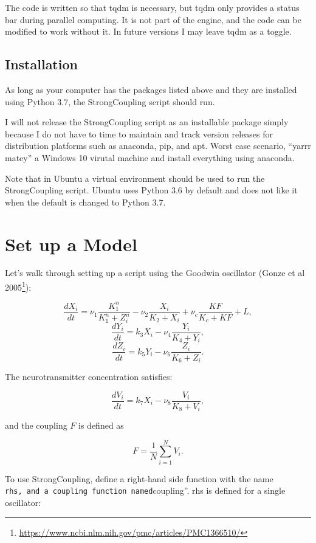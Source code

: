 \documentclass[
  english,
  a4paper,
  oneside]{article}
\DeclareRobustCommand{\href}[2]{#2\footnote{\url{#1}}}
\begin{document}
The code is written so that tqdm is necessary, but tqdm only provides a
status bar during parallel computing. It is not part of the engine, and
the code can be modified to work without it. In future versions I may
leave tqdm as a toggle.

\hypertarget{installation}{%
\subsection{Installation}\label{installation}}

As long as your computer has the packages listed above and they are
installed using Python 3.7, the StrongCoupling script should run.

I will not release the StrongCoupling script as an installable package
simply because I do not have to time to maintain and track version
releases for distribution platforms such as anaconda, pip, and apt.
Worst case scenario, ``yarrr matey'' a Windows 10 virutal machine and
install everything using anaconda.

Note that in Ubuntu a virtual environment should be used to run the
StrongCoupling script. Ubuntu uses Python 3.6 by default and does not
like it when the default is changed to Python 3.7.

\hypertarget{set-up-a-model}{%
\section{Set up a Model}\label{set-up-a-model}}

Let's walk through setting up a script using the Goodwin oscillator
(\href{https://www.ncbi.nlm.nih.gov/pmc/articles/PMC1366510/}{Gonze et
al 2005}):

\[\frac{dX_i}{dt} = \nu_1 \frac{K_1^n}{K_1^n+Z_i^n} - \nu_2 \frac{X_i}{K_2 + X_i}+ \nu_c \frac{KF}{K_c + KF} + L,\]
\[\frac{dY_i}{dt} = k_3 X_i - \nu_4 \frac{Y_i}{K_4 + Y_i},\]
\[\frac{dZ_i}{dt} = k_5 Y_i - \nu_6 \frac{Z_i}{K_6 + Z_i}.\]

The neurotransmitter concentration satisfies:

\[\frac{dV_i}{dt} = k_7 X_i - \nu_8 \frac{V_i}{K_8 + V_i},\]

and the coupling \(F\) is defined as

\[F = \frac{1}{N}\sum_{i=1}^N V_i.\]

To use StrongCoupling, define a right-hand side function with the name
\texttt{rhs\textquotesingle{}\textquotesingle{},\ and\ a\ coupling\ function\ named}coupling''.
rhs is defined for a single oscillator:
\end{document}
